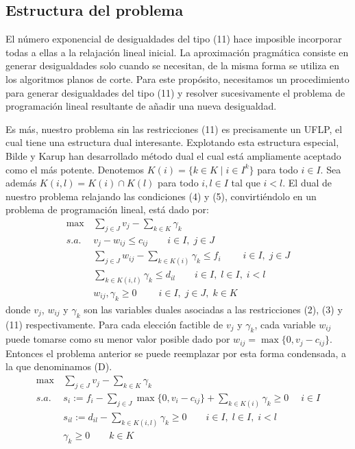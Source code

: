 \documentclass[twoside,12pt]{article}
\begin{document}
\subsection{Estructura del problema}
El número exponencial de desigualdades del tipo (11) hace imposible incorporar todas a ellas a la relajación lineal inicial. La aproximación pragmática consiste en generar desigualdades solo cuando se necesitan, de la misma forma se utiliza en los algoritmos planos de corte. Para este propósito, necesitamos un procedimiento para generar desigualdades del tipo (11) y resolver sucesivamente el problema de programación lineal resultante de añadir una nueva desigualdad.

Es más, nuestro problema sin las restricciones (11) es precisamente un UFLP, el cual tiene una estructura dual interesante. Explotando esta estructura especial, Bilde y Karup \cite{bilde} han desarrollado método dual el cual está ampliamente aceptado como el más potente. Denotemos $K(i) = \{k \in K \mid i \in I^k\}$ para todo $i\in I$. Sea además $K(i,l) = K(i)\cap K(l)$ para todo $i,l \in I$ tal que $i<l$. El dual de nuestro problema relajando las condiciones (4) y (5), convirtiéndolo en un problema de programación lineal, está dado por:
\begin{align*}
\max \,& \sum_{j\in J} v_j - \sum_{k\in K} \gamma_k \\
s.a.\,& v_j - w_{ij} \leq c_{ij} \qquad  i\in I,\;j \in J\\
& \sum_{j\in J} w_{ij} - \sum_{k\in K(i)} \gamma_k \leq f_i \;\qquad i \in I,\; j\in J\\
&\sum_{k\in K(i,l)} \gamma_k \leq d_{il} \qquad i \in I,\; l\in I,\; i<l\\
&w_{ij},\gamma_k \geq 0 \qquad \;i\in I,\; j\in J,\; k\in K
\end{align*}
donde $v_j$, $w_{ij}$ y $\gamma_k$ son las variables duales asociadas a las restricciones (2), (3) y (11) respectivamente. Para cada elección factible de $v_j$ y $\gamma_k$, cada variable $w_{ij}$ puede tomarse como su menor valor posible dado por $w_{ij} = \max\{0,v_j-c_{ij}\}$. Entonces el problema anterior se puede reemplazar por esta forma condensada, a la que denominamos (D).
 \begin{align*}
\max \,& \sum_{j\in J} v_j - \sum_{k\in K} \gamma_k \\
s.a.\,& s_i:= f_i -\sum_{j \in J} \max\{0,v_i-c_{ij}\} + \sum_{k \in K(i)} \gamma_k \geq 0 \;\quad  i \in I \\
& s_{il}:= d_{il} - \sum_{k\in K(i,l)} \gamma_k \geq 0 \qquad i \in I,\; l\in I,\; i<l\\
&\gamma_k \geq 0 \qquad  k\in K
\end{align*}
\end{document}
